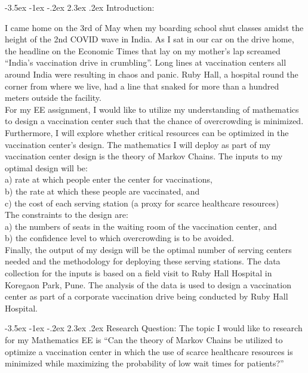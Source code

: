 \documentclass[11pt]{article}
\makeatletter
\renewcommand\section{\@startsection {section}{1}{\z@}%
                                       {-3.5ex \@plus -1ex \@minus -.2ex}%
                                       {2.3ex \@plus.2ex}%
                                       {\normalfont\fontfamily{phv}\fontsize{16}{19}\bfseries}}
\makeatother
\begin{document}
\newpage
\section{Introduction:} \label{s:intro}



I came home on the 3rd of May when my boarding school shut classes amidst the height of the 2nd COVID wave in India. As I sat in our car on the drive home, the headline on the Economic Times that lay on my mother’s lap screamed “India’s vaccination drive in crumbling”. Long lines at vaccination centers all around India were resulting in chaos and panic. Ruby Hall, a hospital round the corner from where we live, had a line that snaked for more than a hundred meters outside the facility.\\
For my EE assignment, I would like to utilize my understanding of mathematics to design a vaccination center such that the chance of overcrowding is minimized. Furthermore, I will explore whether critical resources can be optimized in the vaccination center’s design. The mathematics I will deploy as part of my vaccination center design is the theory of Markov Chains. The inputs to my optimal design will be:\\
a) rate at which people enter the center for vaccinations, \\
b) the rate at which these people are vaccinated, and \\
c) the cost of each serving station (a proxy for scarce healthcare resources) \\
\linebreak
The constraints to the design are:\\
a) the numbers of seats in the waiting room of the vaccination center, and\\
b) the confidence level to which overcrowding is to be avoided. \\
\linebreak
Finally, the output of my design will be the optimal number of serving centers needed and the methodology for deploying these serving stations. The data collection for the inputs is based on a field visit to Ruby Hall Hospital in Koregaon Park, Pune. The analysis of the data is used to design a vaccination center as part of a corporate vaccination drive  being conducted by Ruby Hall Hospital.


\section{Research Question:} \label{s:intro}
The topic I would like to research for my Mathematics EE is “Can the theory of Markov Chains be utilized to optimize a vaccination center in which the use of scarce healthcare resources is minimized while maximizing the probability of low wait times for patients?”
\end{document}
